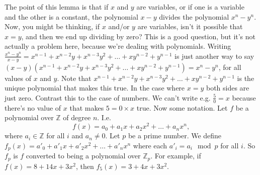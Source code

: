 \documentclass{article}
\theoremstyle{plain}
\newcommand{\bZ}{\mathbb{Z}}
\begin{document}
The point of this lemma is that if $x$ and $y$ are variables, or if one is a variable and the other is a constant, the polynomial $x-y$ divides the polynomial $x^n-y^n$. Now, you might be thinking, if $x$ and/or $y$ are variables, isn't it possible that $x=y$, and then we end up dividing by zero? This is a good question, but it's not actually a problem here, because we're dealing with polynomials. Writing $\frac{x^n-y^n}{x-y} = x^{n-1} + x^{n-2}y + x^{n-3}y^2 + \ldots + x y^{n-2} + y^{n-1}$ is just another way to say $(x-y)(x^{n-1} + x^{n-2}y + x^{n-3}y^2 + \ldots + x y^{n-2} + y^{n-1})=x^n-y^n$, for all values of $x$ and $y$. Note that $x^{n-1} + x^{n-2}y + x^{n-3}y^2 + \ldots + x y^{n-2} + y^{n-1}$ is the unique polynomial that makes this true. In the case where $x = y$ both sides are just zero. Contrast this to the case of numbers. We can't write e.g. $\frac{5}{0} = x$ because there's no value of $x$ that makes $5 = 0\times x$ true. 
Now some notation. Let $f$ be a polynomial over $\bZ$ of degree $n$. I.e. 
\[f(x)= a_0 + a_1 x + a_2 x^2 +\ldots + a_n x^n,\]
where $a_i\in\bZ$ for all $i$ and $a_n\neq 0$. Let $p$ be a prime number. We define $f_p(x) = a'_0 + a'_1 x + a'_2 x^2 +\ldots + a'_n x^n$ where each $a'_i = a_i\mod p$ for all $i$. So $f_p$ is $f$ converted to being a polynomial over $\bZ_p$. For example, if $f(x) = 8 + 14x +3x^2$, then $f_5(x) = 3 + 4x + 3x^2$.
\end{document}
